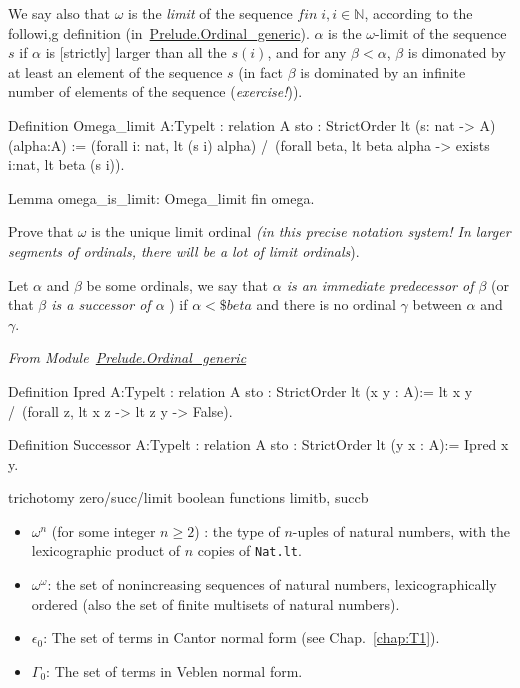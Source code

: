 We say also that $\omega$ is the \emph{limit} of the sequence $\textit{fin}\;i, i\in\mathbb{N}$, according to the followi,g definition (in~\href{../src/html/hydras.Prelude.Ordinal_generic.html}{Prelude.Ordinal\_generic}).
$\alpha$ is the $\omega$-limit of the sequence $s$ if $\alpha$ is [strictly] larger than all the $s(i)$, and for any
$\beta<\alpha$, $\beta$ is dimonated by at least an element of  the sequence $s$ (in fact $\beta$ is dominated by an infinite number of elements of the sequence (\emph{exercise!})).



\begin{Coqsrc}
Definition  Omega_limit
            {A:Type}{lt : relation A}
           {sto : StrictOrder lt} (s: nat -> A) (alpha:A)  :=
  (forall i: nat, lt (s i) alpha) /\
  (forall beta, lt beta  alpha -> exists i:nat, lt beta (s i)).

Lemma omega_is_limit:
   Omega_limit fin omega.
\end{Coqsrc}


\begin{exercise}
Prove that $\omega$ is the unique   limit ordinal \emph{(in this precise notation system! In larger segments of 
ordinals, there will be \emph{a lot} of limit ordinals}).
\end{exercise}

Let $\alpha$ and $\beta$ be some ordinals, we say that \emph{$\alpha$ is an immediate predecessor of $\beta$}
(or that \emph{$\beta$ is a  successor of $\alpha$ }) if $\alpha<\$beta$ and there is no ordinal $\gamma$ between $\alpha$ and $\gamma$.

\noindent\emph{From Module~\href{../src/html/hydras.Prelude.Ordinal_generic.html}{Prelude.Ordinal\_generic}}

\begin{Coqsrc}
Definition Ipred {A:Type}{lt : relation A}
           {sto : StrictOrder lt} (x y : A):=
  lt x y /\ (forall z,  lt x z -> lt z y -> False).

Definition Successor {A:Type}{lt : relation A}
           {sto : StrictOrder lt} (y x : A):= Ipred x y.
\end{Coqsrc}


\begin{todo}
trichotomy zero/succ/limit
boolean functions limitb, succb


\end{todo}
\begin{itemize}
\item $\omega^n$ (for some  integer  $n\geq 2$) : the type of $n$-uples of natural numbers, with the lexicographic product of $n$ copies of \texttt{Nat.lt}.
\item  $\omega^\omega$: the set of nonincreasing sequences of natural numbers, lexicographically ordered (also the set of finite multisets of natural numbers).
\item $\epsilon_0$: The set of terms in Cantor normal form (see Chap.~\ref{chap:T1}).
\item $\Gamma_0$: The set of terms in Veblen normal form.
\end{itemize}


